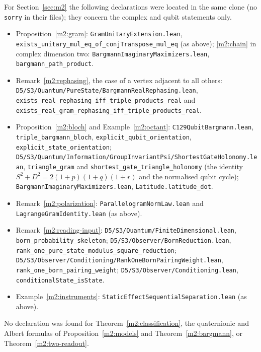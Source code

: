\documentclass[11pt,reqno]{amsart}
\theoremstyle{definition}
\theoremstyle{remark}
\numberwithin{equation}{section}
\begin{document}
For Section~\ref{sec:m2} the following declarations were located in the same clone (no \texttt{sorry} in their files); they concern
the complex and qubit statements only.
{\small\raggedright
\begin{itemize}[leftmargin=1.5em]
\item Proposition~\ref{m2:gram}: \texttt{GramUnitaryExtension.lean}, \texttt{exists\_unitary\_mul\_eq\_of\_conjTranspose\_mul\_eq} (as above);
\eqref{m2:chain} in complex dimension two: \texttt{BargmannImaginaryMaximizers.lean}, \texttt{bargmann\_path\_product}.
\item Remark~\ref{m2:rephasing}, the case of a vertex adjacent to all others: \texttt{D5/S3/Quantum/PureState/BargmannRealRephasing.lean},
\texttt{exists\_real\_rephasing\_iff\_triple\_products\_real} and \texttt{exists\_real\_gram\_rephasing\_iff\_triple\_products\_real}.
\item Proposition~\ref{m2:bloch} and Example~\ref{m2:octant}: \texttt{C129QubitBargmann.lean}, \texttt{triple\_bargmann\_bloch},
\texttt{explicit\_qubit\_orientation}, \texttt{explicit\_state\_orientation};
\texttt{D5/S3/Quantum/Information/GroupInvariantPsi/ShortestGateHolonomy.lean}, \texttt{triangle\_gram} and
\texttt{shortest\_gate\_triangle\_holonomy} (the identity $S^2+D^2=2(1+p)(1+q)(1+r)$ and the normalised qubit cycle);
\texttt{BargmannImaginaryMaximizers.lean}, \texttt{Latitude.latitude\_dot}.
\item Remark~\ref{m2:polarization}: \texttt{ParallelogramNormLaw.lean} and \texttt{LagrangeGramIdentity.lean} (as above).
\item Remark~\ref{m2:reading-input}: \texttt{D5/S3/Quantum/FiniteDimensional.lean}, \texttt{born\_probability\_skeleton};
\texttt{D5/S3/Observer/BornReduction.lean}, \texttt{rank\_one\_pure\_state\_modulus\_square\_reduction};
\texttt{D5/S3/Observer/Conditioning/RankOneBornPairingWeight.lean}, \texttt{rank\_one\_born\_pairing\_weight};
\texttt{D5/S3/Observer/Conditioning.lean}, \texttt{conditionalState\_isState}.
\item Example~\ref{m2:instruments}: \texttt{StaticEffectSequentialSeparation.lean} (as above).
\end{itemize}}
No declaration was found for Theorem~\ref{m2:classification}, the quaternionic and Albert formulas of Proposition~\ref{m2:models} and
Theorem~\ref{m2:bargmann}, or Theorem~\ref{m2:two-readout}.
\end{document}

